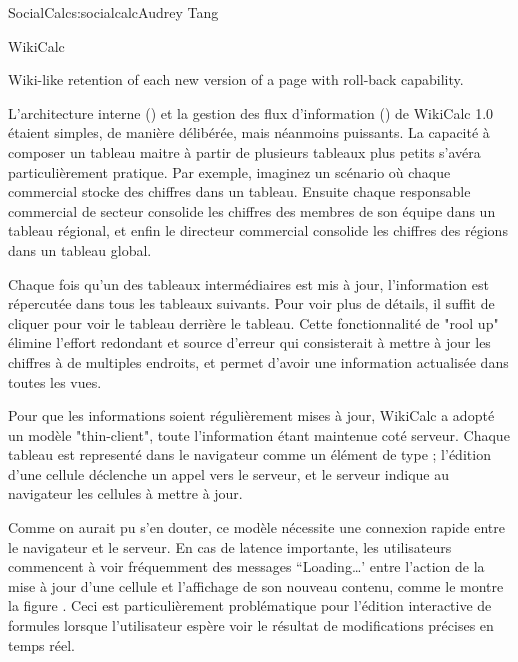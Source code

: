 \begin{aosachapter}{SocialCalc}{s:socialcalc}{Audrey Tang}
\begin{aosasect1}{WikiCalc}
\begin{aosaitemize}
  \item Wiki-like retention of each new version of a page with roll-back
  capability.

\end{aosaitemize}




L'architecture interne () et la gestion des flux d'information () de WikiCalc 1.0 étaient simples, de manière délibérée, mais néanmoins puissants.  La capacité à composer un tableau maitre à partir de plusieurs tableaux plus petits s'avéra particulièrement pratique.  Par exemple, imaginez un scénario où chaque commercial stocke des chiffres dans un tableau.  Ensuite chaque responsable commercial de secteur consolide les chiffres des membres de son équipe dans un tableau régional, et enfin 
le directeur commercial consolide les chiffres des régions dans un tableau global.

Chaque fois qu'un des tableaux intermédiaires est mis à jour, l'information est répercutée dans tous les tableaux suivants.  Pour voir plus de détails, il suffit de cliquer pour voir le tableau derrière le tableau.  Cette fonctionnalité de "rool up" élimine l'effort redondant et source d'erreur qui consisterait à mettre à jour les chiffres à de multiples endroits, et permet d'avoir une information actualisée dans toutes les vues.  

Pour que les informations soient régulièrement mises à jour, WikiCalc a adopté un modèle "thin-client", toute l'information étant maintenue coté serveur.  Chaque tableau est representé dans le navigateur comme un élément de type  ; l'édition d'une cellule déclenche un appel  vers le serveur, et le serveur indique au navigateur les cellules à mettre à jour.

Comme on aurait pu s'en douter, ce modèle nécessite une connexion rapide entre le navigateur et le serveur.  En cas de latence importante, les utilisateurs commencent à voir fréquemment des messages ``Loading\ldots' entre l'action de la mise à jour d'une cellule et l'affichage de son nouveau contenu, comme le montre la figure .  Ceci est particulièrement problématique pour l'édition interactive de formules lorsque l'utilisateur espère voir le résultat de modifications précises en temps réel.  


\end{aosasect1}
\end{aosachapter}
